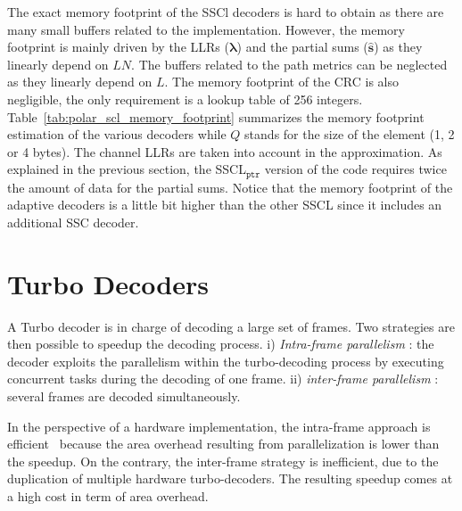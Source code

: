 The exact memory footprint of the SSCl decoders is hard to obtain as there are
many small buffers related to the implementation. However, the memory footprint
is mainly driven by the LLRs ($\bm{\lambda}$) and the partial sums
($\bm{\hat{s}}$) as they linearly depend on $LN$. The buffers related to the
path metrics can be neglected as they linearly depend on $L$. The memory
footprint of the CRC is also negligible, the only requirement is a lookup table
of 256 integers. Table~\ref{tab:polar_scl_memory_footprint} summarizes the
memory footprint estimation of the various decoders while $Q$ stands for the
size of the element (1, 2 or 4 bytes). The channel LLRs are taken into account
in the approximation. As explained in the previous section, the
SSCL$_{\texttt{ptr}}$ version of the code requires twice the amount of data for
the partial sums. Notice that the memory footprint of the adaptive decoders is a
little bit higher than the other SSCL since it includes an additional SSC
decoder.

\section{Turbo Decoders}



A Turbo decoder is in charge of decoding a large set of frames. Two strategies
are then possible to speedup the decoding process. i)
\textit{Intra-frame parallelism} : the decoder exploits the parallelism within
the turbo-decoding process by executing concurrent tasks during
the decoding of one frame. ii) \textit{inter-frame parallelism} : several frames
are decoded simultaneously.

In the perspective of a hardware implementation, the intra-frame approach is
efficient~\cite{Muller2009} because the area overhead resulting from
parallelization is lower than the speedup. On the contrary, the inter-frame
strategy is inefficient, due to the duplication of multiple hardware
turbo-decoders. The resulting speedup comes at a high cost in term of area
overhead.

